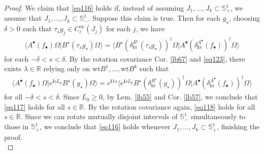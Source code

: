 \documentclass[12pt,b5paper,notitlepage]{article}
\theoremstyle{definition}
\theoremstyle{plain}
\newcommand{\ovl}{\overline}
\newcommand{\bk}[1]{\langle {#1}\rangle}
\newcommand{\im}{\mathbf{i}}
\newcommand{\blt}{\bullet}
\newcommand{\Rbb}{\mathbb R}
\newcommand{\wt}{\mathrm{wt}}
\newcommand{\Sbb}{{\mathbb S}}
\numberwithin{equation}{section}
\begin{document}
\begin{proof}
We claim that \eqref{eq116} holds if, instead of assuming $J_1,\dots,J_k\subset\Sbb^1_+$, we assume that $J_1,\dots,J_k\subset\Sbb^1_-$. Suppose this claim is true. Then for each $g_\star$, choosing $\delta>0$ such that $\tau_sg_j\in C_c^\infty(J_j)$ for each $j$, we have
\begin{align*}
\bk{A^\blt(f_\blt)\Omega|B^\star(\tau_sg_\star)\Omega}=\bk{B^\star(\delta^{B^\star}_{\im\pi}(\tau_sg_\star))^\dagger\Omega|A^\blt(\delta_{\im\pi}^{A^\blt}(f_\blt))^\dagger\Omega} \tag{$\triangle$} \label{eq118}
\end{align*}
for each $-\delta<s<\delta$. By the rotation covariance Cor. \ref{lb67} and \eqref{eq123}, there exists $\lambda\in\Rbb$ relying only on $\wt B^1,\dots,\wt B^k$ such that
\begin{align*}
\bk{A^\blt(f_\blt)\Omega|e^{\im s\ovl{L_0}}B^\star(g_\star)\Omega}=e^{\im \lambda s }\bk{e^{\im s\ovl{L_0}}B^\star(\delta^{B^\star}_{\im\pi}(g_\star))^\dagger\Omega|A^\blt(\delta_{\im\pi}^{A^\blt}(f_\blt))^\dagger\Omega}\tag{$\star$}\label{eq117}
\end{align*}
for all $-\delta<s<\delta$. Since $\ovl{L_0}\geq0$, by Lem. \ref{lb55} and Cor. \ref{lb57}, we conclude that \eqref{eq117} holds for all $s\in\Rbb$. By the rotation covariance again, \eqref{eq118} holds for all $s\in\Rbb$. Since we can rotate mutually disjoint intervals of $\Sbb^1_-$ simultaneously to those in $\Sbb^1_+$, we conclude that \eqref{eq116} holds whenever $J_1,\dots,J_k\subset\Sbb^1_+$, finishing the proof.\\[-1ex]



\end{proof}
\end{document}
